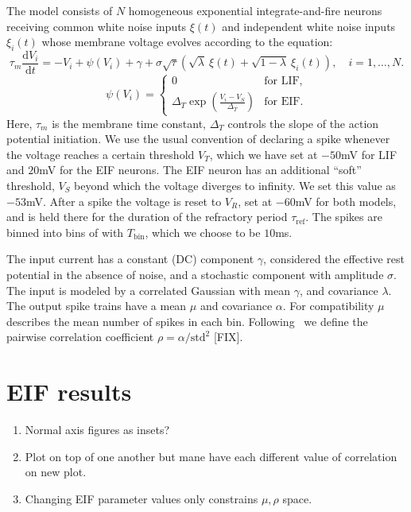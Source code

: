 \documentclass[11pt]{article}
\newcommand{\dd}{\mathrm{d}}
\begin{document}
The model consists of $N$ homogeneous exponential integrate-and-fire neurons receiving common white noise inputs $\xi(t)$ and independent white noise inputs $\xi_i(t)$ whose membrane voltage evolves according to the equation: 
\begin{equation}
\tau_m \frac{\dd V_i}{\dd t} = -V_i +\psi(V_i)+ \gamma+  \sigma \sqrt{\tau} \left( \sqrt{\lambda}~\xi(t) + \sqrt{1-\lambda}~\xi_i(t) \right),\quad i=1,\ldots,N.
\end{equation}
\begin{equation}
\psi(V_i) = 
\begin{cases}
0 & \text{for LIF,}  \\
\Delta_T \exp{\left(\frac{ V_i - V_S}{\Delta_T}\right)} & \text{for EIF}.
\end{cases}
\end{equation}
Here, $\tau_m$ is the membrane time constant, $\Delta_T$ controls the slope of the action potential initiation. We use the usual convention of declaring a spike whenever the voltage reaches a certain threshold $V_T$, which we have set at $-50$mV for LIF and $20$mV for the EIF neurons. The EIF neuron has an additional ``soft'' threshold, $V_S$ beyond which the voltage diverges to infinity. We set this value as $-53$mV. After a spike the voltage is reset to $V_R$, set at $-60$mV for both models, and is held there for the duration of the refractory period $\tau_{\text{ref}}$. The spikes are binned into bins of with $T_\text{bin}$, which we choose to be $10$ms.

The input current has a constant (DC) component $\gamma$, considered the effective rest potential in the absence of noise, and a stochastic component with amplitude $\sigma$. The input is modeled by a correlated Gaussian with mean $\gamma$, and covariance $\lambda$. The output spike trains have a mean $\mu$ and covariance $\alpha$. For compatibility $\mu$ describes the mean number of spikes in each bin. Following~\cite{Macke:2011gw} we define the pairwise correlation coefficient $\rho = \alpha/\text{std}^2$ [FIX].

\newpage
\section{EIF results} %
\begin{enumerate}
\item Normal axis figures as insets?
\item Plot on top of one another but mane have each different value of correlation on new plot.
\item Changing EIF parameter values only constrains $\mu, \rho$ space.
\end{enumerate}
\end{document}
